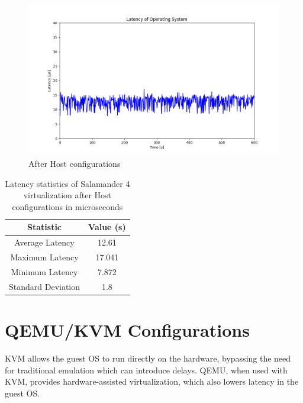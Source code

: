 \documentclass[MMR,Master,english]{twbook}
\begin{document}
\begin{figure}[H]
	\centering
	\includegraphics[width=1.0\columnwidth]{masterthesis-documentation/docs/sigmatek/xenomai/5rt_kernelparam_host/max_latency_rt_kernelparam_host/max_latency_rt_kernelparam_host.png}
	\caption[After Host configurations]{After Host configurations}
	\label{fig:max_latency_rt_kernelparam_host}
\end{figure}

\begin{table}[H]
	\centering
	\caption[Latency statistics of Salamander 4 after Host configurations]{Latency statistics of Salamander 4 virtualization after Host configurations in microseconds}
	\label{tab:latency_statistics_virt}
	\setlength{\tabcolsep}{0.5em} %
	{\renewcommand{\arraystretch}{1.2}%
	\begin{tabular}{|c|c|}\hline
	\textbf{Statistic} & \textbf{Value (\textmu s)} \\\hline
	Average Latency & 12.61 \\\hline
	Maximum Latency & 17.041 \\\hline
	Minimum Latency & 7.872 \\\hline
	Standard Deviation & 1.8 \\\hline
	\end{tabular}}
	\end{table}


\section{QEMU/KVM Configurations}\label{sec:guest_configurations}
KVM allows the guest OS to run directly on the hardware, bypassing the need for traditional emulation which can introduce delays. QEMU, when used with KVM, provides hardware-assisted virtualization, which also lowers latency in the guest OS.
\end{document}
